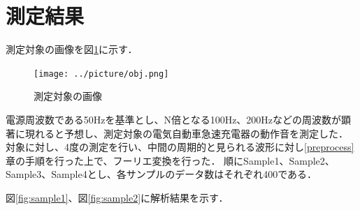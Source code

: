\documentclass[dvipdfmx,titlepage,a4j]{jsarticle}  %
\begin{document}
\section{測定結果}
測定対象の画像を図\ref{fig:sample}に示す．
\begin{figure}[H]
  \centering
  \texttt{[image: ../picture/obj.png]}
  \caption{測定対象の画像}
  \label{fig:sample}
\end{figure}

電源周波数である50Hzを基準とし、N倍となる100Hz、200Hzなどの周波数が顕著に現れると予想し、測定対象の電気自動車急速充電器の動作音を測定した．
対象に対し、4度の測定を行い、中間の周期的と見られる波形に対し\ref{preprocess}章の手順を行った上で、フーリエ変換を行った．
順にSample1、Sample2、Sample3、Sample4とし、各サンプルのデータ数はそれぞれ400である．

図\ref{fig:sample1}、図\ref{fig:sample2}に解析結果を示す．
\end{document}
